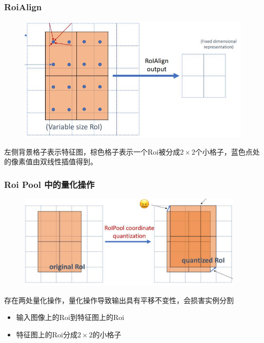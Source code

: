 \documentclass{beamer}
\begin{document}
    \begin{frame}
        \frametitle{RoiAlign}
        \begin{figure}
            \centering
            \includegraphics[height=6cm]{../graphic/roialign.jpg}
        \end{figure}
        左侧背景格子表示特征图，棕色格子表示一个Roi被分成$2\times 2$个小格子，蓝色点处的像素值由双线性插值得到。
    \end{frame}

    \begin{frame}
        \frametitle{Roi Pool 中的量化操作}
        \begin{figure}
            \centering
            \includegraphics[height=4.5cm]{../graphic/roipoolquanti.jpg}
        \end{figure}
        存在两处量化操作，量化操作导致输出具有平移不变性，会损害实例分割 \\
        \begin{itemize}
            \item 输入图像上的Roi到特征图上的Roi
            \item 特征图上的Roi分成$2\times 2$的小格子
        \end{itemize}
    \end{frame}
\end{document}

